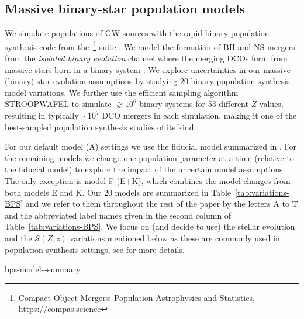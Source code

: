 \documentclass[fleqn,usenatbib]{mnras}
\newcommand{\Zi}{\ensuremath{Z}\xspace}
\newcommand{\SFRD}{\ensuremath{\mathcal{S}(Z,z)}\xspace}
\newcommand{\NmodelsBPS}{\ensuremath{20}\xspace}
\begin{document}
\subsection{Massive binary-star population models}
\label{sec:method-binary-population-synthesis-model-assumptions}

We simulate populations of \ac{GW} sources with the rapid binary population synthesis code from the~{}\footnote{Compact Object Mergers: Population Astrophysics and Statistics,  \url{https://compas.science}} suite \citep{stevenson2017formation, 2018MNRAS.477.4685B, VignaGomez:2018, Broekgaarden:2019, Neijssel:2019,COMPAS:2021methodsPaper}. We model the formation of \ac{BH} and \ac{NS} mergers from the \textit{isolated binary evolution} channel where the merging \acp{DCO} form from massive stars born in a binary system \citep{1976ApJ...207..574S, 1989A&ARv...1..209S}. We explore uncertainties in our massive (binary) star evolution assumptions by studying \NmodelsBPS binary population synthesis model variations.  We further use the efficient sampling algorithm STROOPWAFEL \citep{Broekgaarden:2019} to simulate $\gtrsim 10^6$ binary systems for 53 different \Zi values, resulting in typically $\sim 10^7$ \ac{DCO} mergers in each simulation, making it one of the best-sampled population synthesis studies of its kind. 

For our default model (A) settings we use the fiducial model summarized in  .
For the remaining models we change one population parameter at a time (relative to the fiducial model) to explore the impact of the uncertain model assumptions. The only exception is model F (E+K), which combines the model changes from both models E and K. Our \NmodelsBPS models are summarized in Table~\ref{tab:variations-BPS} and we refer to them throughout the rest of the paper by the letters A to T and the abbreviated label names given in the second column of Table~\ref{tab:variations-BPS}.  We focus on (and decide to use) the stellar evolution and the \SFRD variations mentioned below as these are commonly used in population synthesis settings, see \citet{Broekgaarden:2021} for more details.

%
{bps-models-summary}
%
\end{document}
